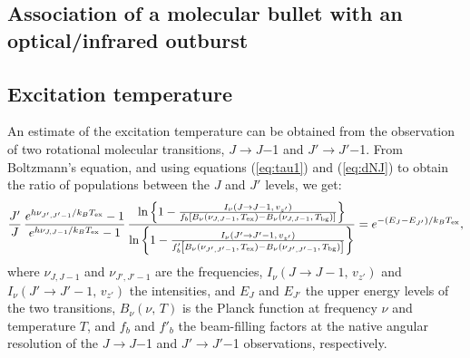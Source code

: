 \documentclass[12pt]{mythesis}
\begin{document}


\subsection{Association of a molecular bullet with an optical/infrared outburst}

\subsection{Excitation temperature}

An estimate of the excitation temperature can be obtained from the observation of two rotational molecular transitions, $J$$\rightarrow$$J$$-$1 and $J'$$\rightarrow$$J'$$-$1. From Boltzmann's equation, and using equations (\ref{eq:tau1}) and (\ref{eq:dNJ}) to obtain the ratio of populations between the $J$ and $J'$ levels, we get:
\begin{equation}
 \frac{J'} {J} \, 
 \frac{e^{h\nu_{J',J'-1}/k_B T_\mathrm{ex}}-1} {e^{h\nu_{J,J-1}/k_B T_\mathrm{ex}}-1} \, 
 \frac{\ln{\left\{1- \frac{I_\nu(J\rightarrow J-1,\, v_{z'})}
{f_b \left[B_\nu(\nu_{J,J-1},\, T_\mathrm{ex}) - B_\nu(\nu_{J,J-1},\, T_{\rm bg})\right]} \right\}}}
 {\ln{\left\{1- \frac{I_\nu(J'\rightarrow J'-1,\, v_{z'})}
{f'_b \left[B_\nu(\nu_{J',J'-1}, \, T_\mathrm{ex})-B_\nu(\nu_{J',J'-1}, \, T_{\rm bg})\right]} \right\}}}
 = e^{-(E_J-E_{J'})/k_B T_\mathrm{ex}},
\label{eq:Jratio3}
\end{equation}
where $\nu_{J,J-1}$ and $\nu_{J',J'-1}$ are the frequencies, $I_\nu(J\rightarrow J-1,\, v_{z'})$ and $I_\nu(J'\rightarrow J'-1,\, v_{z'})$ the intensities, and $E_J$ and $E_{J'}$ the upper energy levels of the two transitions, $B_\nu(\nu,\, T)$ is the Planck function at frequency $\nu$ and temperature $T$, and $f_b$ and $f'_b$ the beam-filling factors at the native angular resolution of the $J$$\rightarrow$$J$$-$1 and $J'$$\rightarrow$$J'$$-$1 observations, respectively.
\end{document}
